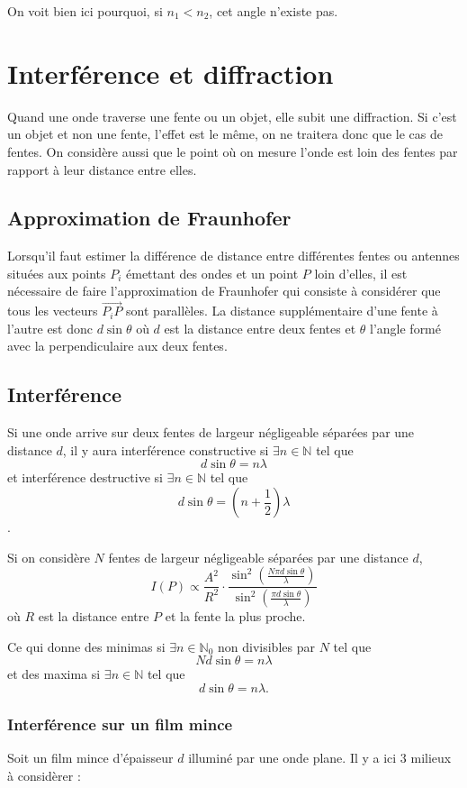 On voit bien ici pourquoi, si $n_1 < n_2$, cet angle n'existe pas.

\section{Interférence et diffraction}
Quand une onde traverse une fente ou un objet, elle subit une diffraction.
Si c'est un objet et non une fente, l'effet est le même,
on ne traitera donc que le cas de fentes.
On considère aussi que le point où on mesure l'onde est loin des fentes
par rapport à leur distance entre elles.

\subsection{Approximation de Fraunhofer}
\label{sec:fraunhofer}
Lorsqu'il faut estimer la différence de distance entre différentes
fentes ou antennes situées aux points $P_i$ émettant des ondes
et un point $P$ loin d'elles,
il est nécessaire de faire l'approximation de Fraunhofer qui
consiste à considérer que tous les vecteurs $\vec{P_iP}$
sont parallèles.
La distance supplémentaire d'une fente à l'autre est donc $d\sin\theta$
où $d$ est la distance entre deux fentes et $\theta$ l'angle
formé avec la perpendiculaire aux deux fentes.

\subsection{Interférence}
Si une onde arrive sur deux fentes de largeur négligeable séparées par
une distance $d$,
il y aura interférence constructive si $\exists n \in \mathbb{N}$ tel que
\[ d\sin\theta = n \lambda \]
et interférence destructive si $\exists n \in \mathbb{N}$ tel que
\[ d\sin\theta = \left(n+\frac{1}{2}\right) \lambda \].

Si on considère $N$ fentes de largeur négligeable séparées par une
distance $d$,
\[ I(P) \propto \frac{A^2}{R^2} \cdot
  \frac{\sin^2\left(\frac{N \pi d \sin\theta}{\lambda}\right)}
{\sin^2\left(\frac{\pi d \sin\theta}{\lambda}\right)} \]
où $R$ est la distance entre $P$ et la fente la plus proche.

Ce qui donne des minimas si
$\exists n \in \mathbb{N}_0$ non divisibles par $N$ tel que
\[ N d \sin \theta = n \lambda \]
et des maxima si $\exists n \in \mathbb{N}$ tel que
\[ d \sin \theta = n \lambda. \]

\subsubsection{Interférence sur un film mince}
Soit un film mince d'épaisseur $d$ illuminé par une onde
plane. Il y a ici 3 milieux à considèrer :

